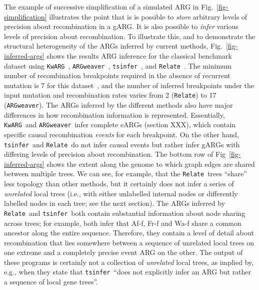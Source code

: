 \documentclass{article}
\newcommand{\tsinfer}[0]{\texttt{tsinfer}}
\newcommand{\kwarg}[0]{\texttt{KwARG}}
\newcommand{\argweaver}[0]{\texttt{ARGweaver}}
\newcommand{\relate}[0]{\texttt{Relate}}
\begin{document}
The example of successive simplification of a simulated ARG
in Fig.~\ref{fig-simplification} illustrates the point
that is is possible to \emph{store} arbitrary levels of precision
about recombination in a gARG.
It is also possible to \emph{infer} various levels of precision about
recombination.
To illustrate this, and to demonstrate the structural
heterogeneity of the ARGs inferred  by current methods,
Fig.~\ref{fig-inferred-args} shows the results ARG inference
for the classical \citet{kreitman1983nucleotide} benchmark dataset
using  \kwarg~\citep{ignatieva2021kwarg},
\argweaver~\citep{rasmussen2014genome,hubisz2020inference},
\tsinfer~\citep{kelleher2019inferring},
and \relate~\citep{speidel2019method}.
The minimum number
of recombination breakpoints required in the absence of recurrent mutation
is 7 for this dataset~\citep{song2003parsimonious},
and the number of inferred breakpoints
under the input mutation and recombination rates
varies from 2 (\relate) to 17 (\argweaver).
The ARGs inferred by the different methods also have major differences
in how recombination information is represented.
Essentially,
\kwarg\ and \argweaver\ infer complete eARGs (section XXX),
which contain specific causal recombination \emph{events}
for each breakpoint.
On the other hand, \tsinfer\ and
\relate\ do not infer causal events but rather
infer gARGs with differing levels of precision about recombination.
The bottom row of Fig~\ref{fig-inferred-args} shows the extent along
the genome to which graph edges are shared between multiple trees.
We can see, for example, that the \relate\ trees ``share'' less topology
than other methods, but it certainly does not infer a series of
\emph{unrelated} local trees (i.e., with either unlabelled internal
nodes or differently labelled nodes in each tree; see the
next section).
The ARGs inferred by \relate\ and \tsinfer\ both contain substantial
information about node sharing across trees; for example,
both infer that Af-f, Fr-f and Wa-f share a common ancestor along
the entire sequence.
Therefore, they contain a level of detail about recombination
that lies somewhere between a sequence of unrelated local trees on one
extreme and a completely precise event ARG on the other.
The output of these programs is certainly not a collection of
\emph{unrelated} local trees, as implied by,
e.g.,
\citet{hejase2020summary} when they state that \tsinfer\
``does not explicitly infer an ARG but rather a sequence of local
gene trees''.
\end{document}
